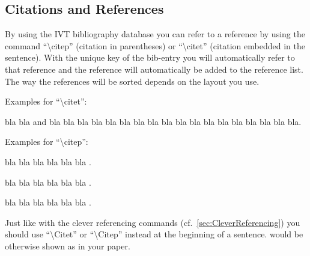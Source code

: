 \subsection{Citations and References}

By using the IVT bibliography database you can refer to a reference by
using the command ``\textbackslash{}citep'' (citation in parentheses)
or ``\textbackslash{}citet''
(citation embedded in the sentence). With the unique key of the
bib-entry you will automatically refer to that reference and the
reference will automatically be added to the reference list. The way
the references will be sorted depends on the layout you use. 

Examples for ``\textbackslash{}citet'':

bla bla \citet{axhausen2008income} and
\citet{matsimbook}
bla bla bla bla bla bla bla bla bla bla
\citet{axhausen2008income,matsimbook}
bla bla bla bla bla bla bla bla.

Examples for ``\textbackslash{}citep'':

bla bla bla bla bla bla
\citep[e.g.,]{matsimbook,axhausen2008income}.

bla bla bla bla bla bla \citep[see also][pp.325-378]{axhausen2008income}.

bla bla bla bla bla bla \citep{axhausen2008income}.

Just like with the clever referencing commands (cf.~\cref{sec:CleverReferencing})
you should use ``\textbackslash{}Citet'' or ``\textbackslash{}Citep'' instead
at the beginning of a sentence.
would be otherwise shown as \citet{axhausen2008income}
in your paper.
